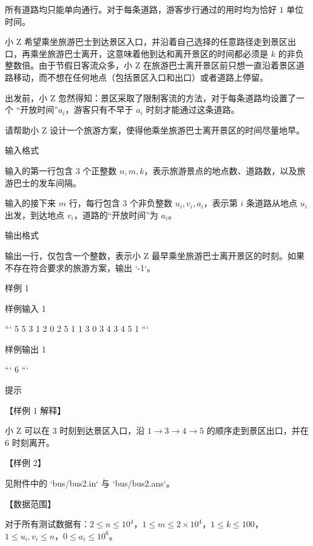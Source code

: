 \documentclass[12pt,twiside,a4paper]{ctexbook}
\numberwithin{chapter}{part}
\begin{document}
所有道路均只能单向通行。对于每条道路，游客步行通过的用时均为恰好 $1$ 单位时间。

小 Z 希望乘坐旅游巴士到达景区入口，并沿着自己选择的任意路径走到景区出口，再乘坐旅游巴士离开，这意味着他到达和离开景区的时间都必须是 $k$ 的非负整数倍。由于节假日客流众多，小 Z 在旅游巴士离开景区前只想一直沿着景区道路移动，而不想在任何地点（包括景区入口和出口）或者道路上停留。

出发前，小 Z 忽然得知：景区采取了限制客流的方法，对于每条道路均设置了一个
“开放时间”$a _ i$，游客只有不早于 $a _ i$ 时刻才能通过这条道路。

请帮助小 Z 设计一个旅游方案，使得他乘坐旅游巴士离开景区的时间尽量地早。

 输入格式

输入的第一行包含 3 个正整数 $n, m, k$，表示旅游景点的地点数、道路数，以及旅游巴士的发车间隔。

输入的接下来 $m$ 行，每行包含 3 个非负整数 $u _ i, v _ i, a_ i$，表示第 $i$ 条道路从地点 $u _ i$ 出发，到达地点 $v _ i$，道路的“开放时间”为 $a _ i$。

 输出格式

输出一行，仅包含一个整数，表示小 Z 最早乘坐旅游巴士离开景区的时刻。如果不存在符合要求的旅游方案，输出 `-1`。

 样例 1

 样例输入 1

```
5 5 3
1 2 0
2 5 1
1 3 0
3 4 3
4 5 1
```

 样例输出 1

```
6
```

 提示

【样例 1 解释】

小 Z 可以在 $3$ 时刻到达景区入口，沿 $1 \to 3 \to 4 \to 5$ 的顺序走到景区出口，并在 $6$ 时刻离开。

【样例 2】

见附件中的 `bus/bus2.in` 与 `bus/bus2.ans`。

【数据范围】

对于所有测试数据有：$2 \leq n \leq 10 ^ 4$，$1 \leq m \leq 2 \times 10 ^ 4$，$1 \leq k \leq 100$，$1 \leq u _ i, v _ i \leq n$，$0 \leq a _ i \leq 10 ^ 6$。
\end{document}
